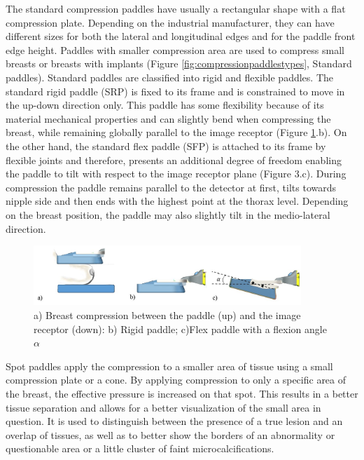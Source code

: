  The standard compression paddles have usually a rectangular shape with a flat compression plate. Depending on the industrial manufacturer, they can have different sizes for both the lateral and longitudinal edges and for the paddle front edge height. Paddles with smaller compression area are used to compress small breasts or breasts with implants (Figure \ref{fig:compressionpaddlestypes}, Standard paddles). Standard paddles are classified into rigid and flexible paddles. The standard rigid paddle (SRP) is fixed to its frame and is constrained to move in the up-down direction only. This paddle has some flexibility because of its material mechanical properties and can slightly bend when compressing the breast, while remaining globally parallel to the image receptor (Figure \ref{fig:compressionpaddles}.b). On the other hand, the standard flex paddle (SFP)  is attached to its frame by flexible joints and therefore, presents an additional degree of freedom enabling the paddle to tilt with respect to the image receptor plane (Figure 3.c). During compression the paddle remains parallel to the detector at first, tilts towards nipple side and then ends with the highest point at the thorax level. Depending on the breast position, the paddle may also slightly tilt in the medio-lateral direction.

\begin{figure}[!h]
\centering
\includegraphics[width=0.9\textwidth,keepaspectratio]{figures/compressionpaddles.jpg} 
\caption{a) Breast compression between the paddle (up) and the image receptor (down): b) Rigid paddle; c)Flex paddle with a flexion angle $\alpha$}\label{fig:compressionpaddles}
\end{figure}


 Spot paddles apply the compression to a smaller area of tissue using a small compression plate or a cone. By applying compression to only a specific area of the breast, the effective pressure is increased on that spot. This results in a better tissue separation and allows for a better visualization of the small area in question.  It is used to distinguish between the presence of a true lesion and an overlap of tissues, as well as to better show the borders of an abnormality or questionable area or a little cluster of faint microcalcifications.  

